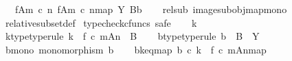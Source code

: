 \begin{isabellebody}
\ \ \ {\isachardoublequoteopen}{\isacharparenleft}{\kern0pt}f{\isasymlparr}A{\isasymrparr}\isactrlbsub m\ {\isasymcirc}\isactrlsub c\ n\isactrlesub {\isacharcomma}{\kern0pt}\ {\isacharbrackleft}{\kern0pt}f{\isasymlparr}A{\isasymrparr}\isactrlbsub m\ {\isasymcirc}\isactrlsub c\ n\isactrlesub {\isacharbrackright}{\kern0pt}map{\isacharparenright}{\kern0pt}\ {\isasymsubseteq}\isactrlbsub Y\isactrlesub \ {\isacharparenleft}{\kern0pt}B{\isacharcomma}{\kern0pt}b{\isacharparenright}{\kern0pt}{\isachardoublequoteclose}\isanewline
%
\isadelimproof
\ \ %
\endisadelimproof
%
\isatagproof
{}\isamarkupfalse%
\ rel{\isacharunderscore}{\kern0pt}sub{}\ image{\isacharunderscore}{\kern0pt}subobj{\isacharunderscore}{\kern0pt}map{\isacharunderscore}{\kern0pt}mono\isanewline
\ \ \isamarkupfalse%
\ relative{\isacharunderscore}{\kern0pt}subset{\isacharunderscore}{\kern0pt}def{}\isanewline
{}\isamarkupfalse%
\ {\isacharparenleft}{\kern0pt}typecheck{\isacharunderscore}{\kern0pt}cfuncs{\isacharcomma}{\kern0pt}\ safe{\isacharparenright}{\kern0pt}\isanewline
\ \ \isamarkupfalse%
\ k\isanewline
\ \ \isamarkupfalse%
\ k{\isacharunderscore}{\kern0pt}type{\isacharbrackleft}{\kern0pt}type{\isacharunderscore}{\kern0pt}rule{\isacharbrackright}{\kern0pt}{\isacharcolon}{\kern0pt}\ {\isachardoublequoteopen}k\ {\isacharcolon}{\kern0pt}\ {\isacharparenleft}{\kern0pt}f\ {\isasymcirc}\isactrlsub c\ m{\isacharparenright}{\kern0pt}{\isasymlparr}A{\isasymrparr}\isactrlbsub n\isactrlesub \ {\isasymrightarrow}\ B{\isachardoublequoteclose}\isanewline
\ \ \isamarkupfalse%
\ b{\isacharunderscore}{\kern0pt}type{\isacharbrackleft}{\kern0pt}type{\isacharunderscore}{\kern0pt}rule{\isacharbrackright}{\kern0pt}{\isacharcolon}{\kern0pt}\ {\isachardoublequoteopen}b\ {\isacharcolon}{\kern0pt}\ B\ {\isasymrightarrow}\ Y{\isachardoublequoteclose}\isanewline
\ \ \isamarkupfalse%
\ b{\isacharunderscore}{\kern0pt}mono{\isacharcolon}{\kern0pt}\ {\isachardoublequoteopen}monomorphism\ b{\isachardoublequoteclose}\isanewline
\ \ \isamarkupfalse%
\ b{\isacharunderscore}{\kern0pt}k{\isacharunderscore}{\kern0pt}eq{\isacharunderscore}{\kern0pt}map{\isacharcolon}{\kern0pt}\ {\isachardoublequoteopen}b\ {\isasymcirc}\isactrlsub c\ k\ {\isacharequal}{\kern0pt}\ {\isacharbrackleft}{\kern0pt}{\isacharparenleft}{\kern0pt}f\ {\isasymcirc}\isactrlsub c\ m{\isacharparenright}{\kern0pt}{\isasymlparr}A{\isasymrparr}\isactrlbsub n\isactrlesub {\isacharbrackright}{\kern0pt}map{\isachardoublequoteclose}\isanewline

\end{isabellebody}
